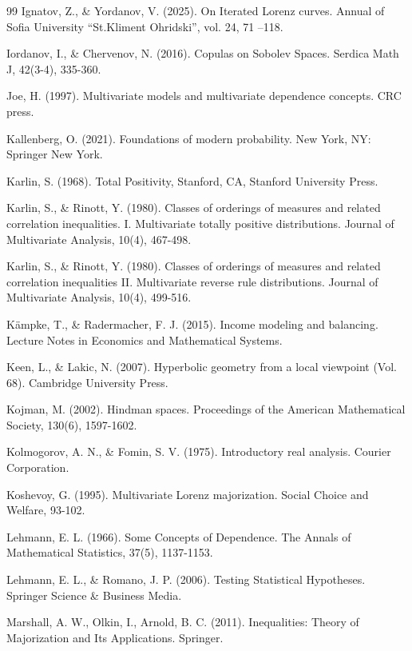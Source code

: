 \documentclass[onecolumn]{article}
\begin{document}
\begin{thebibliography}{99}
\bibitem{[3]} Ignatov, Z., \& Yordanov, V. (2025). On Iterated Lorenz
curves. Annual of Sofia University \textquotedblleft St.Kliment
Ohridski\textquotedblright , vol. 24, 71 --118.

\bibitem{[16]} Iordanov, I., \& Chervenov, N. (2016). Copulas on Sobolev
Spaces. Serdica Math J, 42(3-4), 335-360.

\bibitem{[27]} Joe, H. (1997). Multivariate models and multivariate
dependence concepts. CRC press.

\bibitem{[75]} Kallenberg, O. (2021). Foundations of modern probability. New
York, NY: Springer New York.

\bibitem{[36]} Karlin, S. (1968). Total Positivity, Stanford, CA, Stanford
University Press.

\bibitem{[32]} Karlin, S., \& Rinott, Y. (1980). Classes of orderings of
measures and related correlation inequalities. I. Multivariate totally
positive distributions. Journal of Multivariate Analysis, 10(4), 467-498.

\bibitem{[40]} Karlin, S., \& Rinott, Y. (1980). Classes of orderings of
measures and related correlation inequalities II. Multivariate reverse rule
distributions. Journal of Multivariate Analysis, 10(4), 499-516.

\bibitem{[10]} K\"{a}mpke, T., \& Radermacher, F. J. (2015). Income modeling
and balancing. Lecture Notes in Economics and Mathematical Systems.

\bibitem{[53]} Keen, L., \& Lakic, N. (2007). Hyperbolic geometry from a
local viewpoint (Vol. 68). Cambridge University Press.

\bibitem{[59]} Kojman, M. (2002). Hindman spaces. Proceedings of the
American Mathematical Society, 130(6), 1597-1602.

\bibitem{[69]} Kolmogorov, A. N., \& Fomin, S. V. (1975). Introductory real
analysis. Courier Corporation.

\bibitem{[9]} Koshevoy, G. (1995). Multivariate Lorenz majorization. Social
Choice and Welfare, 93-102.

\bibitem{[61]} Lehmann, E. L. (1966). Some Concepts of Dependence. The
Annals of Mathematical Statistics, 37(5), 1137-1153.

\bibitem{[39]} Lehmann, E. L., \& Romano, J. P. (2006). Testing Statistical
Hypotheses. Springer Science \& Business Media.

\bibitem{[38]} Marshall, A. W., Olkin, I., Arnold, B. C. (2011).
Inequalities: Theory of Majorization and Its Applications. Springer.


\end{thebibliography}
\end{document}
